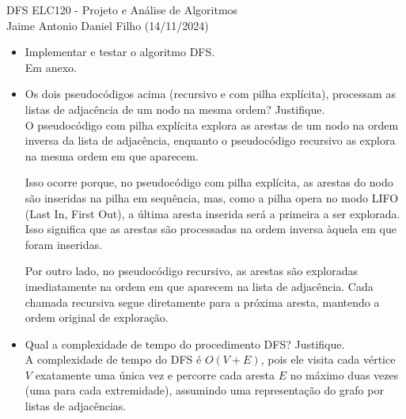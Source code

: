 \documentclass{article}
\begin{document}
\noindent DFS \hfill ELC120 - Projeto e Análise de Algoritmos \\
Jaime Antonio Daniel Filho (14/11/2024)

\noindent \hrulefill
\begin{itemize}
    \item Implementar e testar o algoritmo DFS. \\
    
    Em anexo.
    
    \item Os dois pseudocódigos acima (recursivo e com pilha explícita), processam as listas de adjacência de um nodo na mesma ordem? Justifique. \\

    O pseudocódigo com pilha explícita explora as arestas de um nodo na ordem inversa da lista de adjacência, enquanto o pseudocódigo recursivo as explora na mesma ordem em que aparecem.
    
    Isso ocorre porque, no pseudocódigo com pilha explícita, as arestas do nodo são inseridas na pilha em sequência, mas, como a pilha opera no modo LIFO (Last In, First Out), a última aresta inserida será a primeira a ser explorada. Isso significa que as arestas são processadas na ordem inversa àquela em que foram inseridas.
    
    Por outro lado, no pseudocódigo recursivo, as arestas são exploradas imediatamente na ordem em que aparecem na lista de adjacência. Cada chamada recursiva segue diretamente para a próxima aresta, mantendo a ordem original de exploração.
    
    \item Qual a complexidade de tempo do procedimento DFS? Justifique. \\

    A complexidade de tempo do DFS é $O(V + E)$, pois ele visita cada vértice $V$ exatamente uma única vez e percorre cada aresta $E$ no máximo duas vezes (uma para cada extremidade), assumindo uma representação do grafo por listas de adjacências.
    
\end{itemize}
\end{document}
